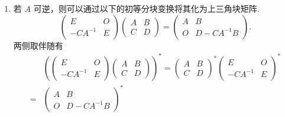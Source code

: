 \begin{exercise}
\begin{exgroup}
\begin{answer}
\begin{enumerate}
                \item 若 $A$ 可逆，则可以通过以下的初等分块变换将其化为上三角块矩阵.
                      \[\begin{pmatrix}
                              E        & O \\
                              -CA^{-1} & E
                          \end{pmatrix} \begin{pmatrix}
                              A & B \\
                              C & D
                          \end{pmatrix} = \begin{pmatrix}
                              A & B          \\
                              O & D-CA^{-1}B
                          \end{pmatrix}.\]
                      两侧取伴随有
                      \begin{align*}
                              & \left(\begin{pmatrix}
                                              E        & O \\
                                              -CA^{-1} & E
                                          \end{pmatrix}
                          \begin{pmatrix}
                                  A & B \\
                                  C & D
                              \end{pmatrix}\right)^*
                          = \begin{pmatrix}
                                A & B \\
                                C & D
                            \end{pmatrix}^*
                          \begin{pmatrix}
                              E        & O \\
                              -CA^{-1} & E
                          \end{pmatrix}^*            \\
                          ={} & \begin{pmatrix}
                                    A & B          \\
                                    O & D-CA^{-1}B
                                \end{pmatrix}^*

\end{align*}
\end{enumerate}
\end{answer}
\end{exgroup}
\end{exercise}
